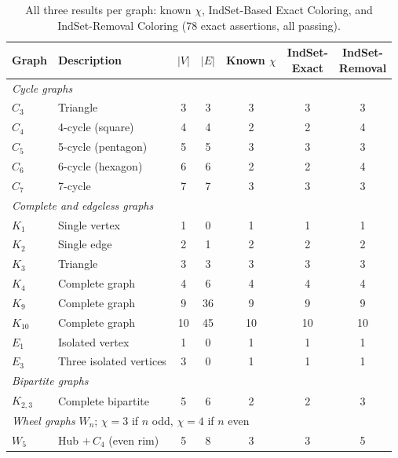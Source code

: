 \documentclass[11pt]{article}
\begin{document}
\begin{table}[ht]
\centering
\caption{All three results per graph: known $\chi$, IndSet-Based Exact Coloring,
  and IndSet-Removal Coloring (78 exact assertions, all passing).}
\label{tab:results}
\begin{tabular}{llccccc}
\toprule
Graph & Description & $|V|$ & $|E|$ & \makecell{Known\\$\chi$} & \makecell{IndSet-\\Exact} & \makecell{IndSet-\\Removal} \\
\midrule
\multicolumn{7}{l}{\textit{Cycle graphs}} \\
$C_3$ & Triangle                    & 3  & 3   & 3  & 3  & 3  \\
$C_4$ & 4-cycle (square)            & 4  & 4   & 2  & 2  & 4  \\
$C_5$ & 5-cycle (pentagon)          & 5  & 5   & 3  & 3  & 3  \\
$C_6$ & 6-cycle (hexagon)           & 6  & 6   & 2  & 2  & 4  \\
$C_7$ & 7-cycle                     & 7  & 7   & 3  & 3  & 3  \\
\midrule
\multicolumn{7}{l}{\textit{Complete and edgeless graphs}} \\
$K_1$ & Single vertex               & 1  & 0   & 1  & 1  & 1  \\
$K_2$ & Single edge                 & 2  & 1   & 2  & 2  & 2  \\
$K_3$ & Triangle                    & 3  & 3   & 3  & 3  & 3  \\
$K_4$ & Complete graph              & 4  & 6   & 4  & 4  & 4  \\
$K_9$ & Complete graph              & 9  & 36  & 9  & 9  & 9  \\
$K_{10}$ & Complete graph           & 10 & 45  & 10 & 10 & 10 \\
$E_1$ & Isolated vertex             & 1  & 0   & 1  & 1  & 1  \\
$E_3$ & Three isolated vertices     & 3  & 0   & 1  & 1  & 1  \\
\midrule
\multicolumn{7}{l}{\textit{Bipartite graphs}} \\
$K_{2,3}$ & Complete bipartite      & 5  & 6   & 2  & 2  & 3  \\
\midrule
\multicolumn{7}{l}{\textit{Wheel graphs} $W_n$; $\chi=3$ if $n$ odd, $\chi=4$ if $n$ even} \\
$W_5$ & Hub $+\,C_4$ (even rim)     & 5  & 8   & 3  & 3  & 5  \\

\end{tabular}
\end{table}
\end{document}
